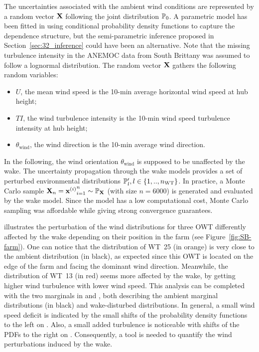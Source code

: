 The uncertainties associated with the ambient wind conditions are represented by a random vector $\bX$ following the joint distribution $\P_0$. 
A parametric model has been fitted in \cite{vanem_fekhari_2023} using conditional probability density functions to capture the dependence structure, 
but the semi-parametric inference proposed in Section~\ref{sec:32_inference} could have been an alternative. 
Note that the missing turbulence intensity in the ANEMOC data from South Brittany was assumed to follow a lognormal distribution.   
The random vector $\bX$ gathers the following random variables:
\begin{itemize}
    \item $U$, the mean wind speed is the 10-min average horizontal wind speed at hub height;
    \item $TI$, the wind turbulence intensity is the 10-min wind speed turbulence intensity at hub height;
    \item $\theta_{\mathrm{wind}}$, the wind direction is the 10-min average wind direction.
\end{itemize}

In the following, the wind orientation $\theta_{\mathrm{wind}}$ is supposed to be unaffected by the wake. 
The uncertainty propagation through the wake models provides a set of perturbed environmental distributions $\P_l', l \in \left\{1,..,n_{\mathrm{WT}}\right\}$. 
In practice, a Monte Carlo sample $\bX_n={\bx^{(i)}}_{i=1}^n \sim \P_{\bX}$ (with size $n=6000$) is generated and evaluated by the wake model. 
Since the model has a low computational cost, Monte Carlo sampling was affordable while giving strong convergence guarantees. 

 illustrates the perturbation of the wind distributions for three OWT differently affected by the wake depending on their position in the farm (see Figure~\ref{fig:SB-farm}). 
One can notice that the distribution of WT~25 (in orange) is very close to the ambient distribution (in black), as expected since this OWT is located on the edge of the farm and facing the dominant wind direction. 
Meanwhile, the distribution of WT~13 (in red) seems more affected by the wake, by getting higher wind turbulence with lower wind speed. 
This analysis can be completed with the two marginals in  and , both describing the ambient marginal distributions (in black) and wake-disturbed distributions. 
In general, a small wind speed deficit is indicated by the small shifts of the probability density functions to the left on . 
Also, a small added turbulence is noticeable with shifts of the PDFs to the right on . 
Consequently, a tool is needed to quantify the wind perturbations induced by the wake.

